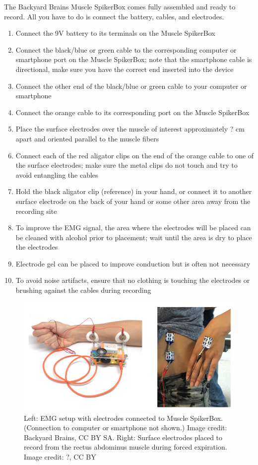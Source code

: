 \documentclass{article}
\begin{document}
The Backyard Brains Muscle SpikerBox comes fully assembled and ready to record. All you have to do is connect the battery, cables, and electrodes.

\begin{enumerate}
\item Connect the 9V battery to its terminals on the Muscle SpikerBox
\item Connect the black/blue or green cable to the corresponding computer or smartphone port on the Muscle SpikerBox; note that the smartphone cable is directional, make sure you have the correct end inserted into the device
\item Connect the other end of the black/blue or green cable to your computer or smartphone
\item Connect the orange cable to its corresponding port on the Muscle SpikerBox
\item Place the surface electrodes over the muscle of interest approximately ? cm apart and oriented parallel to the muscle fibers
\item Connect each of the red aligator clips on the end of the orange cable to one of the surface electrodes; make sure the metal clips do not touch and try to avoid entangling the cables
\item Hold the black aligator clip (reference) in your hand, or connect it to another surface electrode on the back of your hand or some other area away from the recording site
\item To improve the EMG signal, the area where the electrodes will be placed can be cleaned with alcohol prior to placement; wait until the area is dry to place the electrodes
\item Electrode gel can be placed to improve conduction but is often not necessary
\item To avoid noise artifacts, ensure that no clothing is touching the electrodes or brushing against the cables during recording
\end{enumerate}

\begin{figure}[!htbp]
\centering
\includegraphics[width=0.9\linewidth]{files/EPpXta8zJdzN048lz8AR-764cfa4421f63b210684110b072ba9c3.png}
\caption[]{Left: EMG setup with electrodes connected to Muscle SpikerBox. (Connection to computer or smartphone not shown.) Image credit: Backyard Brains, CC BY SA. Right: Surface electrodes placed to record from the rectus abdominus muscle during forced expiration. Image credit: ?, CC BY}
\label{qTGoF5ofMu}
\end{figure}
\end{document}
